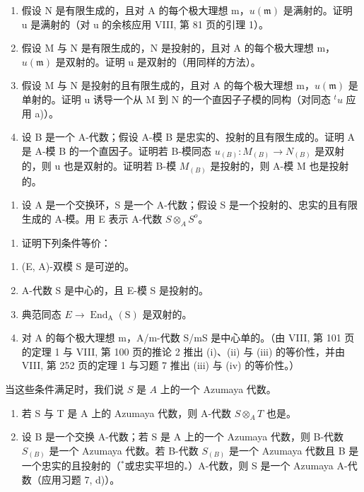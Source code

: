 \begin{enumerate}
\def\labelenumi{\alph{enumi})}
\item
  假设 N 是有限生成的，且对 A 的每个极大理想 m，\(u(\mathfrak{m})\) 是满射的。证明 u 是满射的（对 u 的余核应用 VIII, 第 81 页的引理 1）。
\item
  假设 M 与 N 是有限生成的，N 是投射的，且对 A 的每个极大理想 m，\(u(\mathfrak{m})\) 是双射的。证明 u 是双射的（用同样的方法）。
\item
  假设 M 与 N 是投射的且有限生成的，且对 A 的每个极大理想 m，\(u(\mathfrak{m})\) 是单射的。证明 u 诱导一个从 M 到 N 的一个直因子子模的同构（对同态 \(^{t}u\) 应用 a)）。
\item
  设 B 是一个 A-代数；假设 A-模 B 是忠实的、投射的且有限生成的。证明 A 是 A-模 B 的一个直因子。证明若 B-模同态 \(u_{(B)} : M_{(B)} \to N_{(B)}\) 是双射的，则 u 也是双射的。证明若 B-模 \(M_{(B)}\) 是投射的，则 A-模 M 也是投射的。
\end{enumerate}

\begin{enumerate}
\def\labelenumi{\arabic{enumi})}
\setcounter{enumi}{7}
\tightlist
\item
  设 A 是一个交换环，S 是一个 A-代数；假设 S 是一个投射的、忠实的且有限生成的 A-模。用 E 表示 A-代数 \(S \otimes_{A} S^{o}\)。
\end{enumerate}

\begin{enumerate}
\def\labelenumi{\alph{enumi})}
\tightlist
\item
  证明下列条件等价：
\end{enumerate}

\begin{enumerate}
\def\labelenumi{(\roman{enumi})}
\item
  (E, A)-双模 S 是可逆的。
\item
  A-代数 S 是中心的，且 E-模 S 是投射的。
\item
  典范同态 \(E \longrightarrow \operatorname{End}_{\mathrm{A}}(\mathrm{S})\) 是双射的。
\item
  对 A 的每个极大理想 m，A/m-代数 S/mS 是中心单的。（由 VIII, 第 101 页的定理 1 与 VIII, 第 100 页的推论 2 推出 (i)、(ii) 与 (iii) 的等价性，并由 VIII, 第 252 页的定理 1 与习题 7 推出 (iii) 与 (iv) 的等价性。）
\end{enumerate}

当这些条件满足时，我们说 \(S\) 是 \(A\) 上的一个 Azumaya 代数。

\begin{enumerate}
\def\labelenumi{\alph{enumi})}
\setcounter{enumi}{1}
\item
  若 S 与 T 是 A 上的 Azumaya 代数，则 A-代数 \(S \otimes_{A} T\) 也是。
\item
  设 B 是一个交换 A-代数；若 S 是 A 上的一个 Azumaya 代数，则 B-代数 \(S_{(B)}\) 是一个 Azumaya 代数。若 B-代数 \(S_{(B)}\) 是一个 Azumaya 代数且 B 是一个忠实的且投射的（\(^{*}\)或忠实平坦的\(_{*}\)）A-代数，则 S 是一个 Azumaya A-代数（应用习题 7, d)）。
\end{enumerate}


